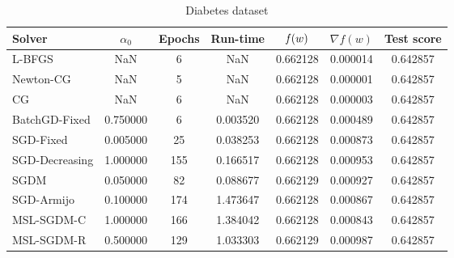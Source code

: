 \cleardoublepage
\begin{table}
\centering
\caption{Diabetes dataset}
\label{tab:diab-table}
\begin{tabular}{lS[round-precision=3]S[drop-zero-decimal]S[round-precision=4]S[round-precision=6]S[exponent-mode=scientific]S[round-precision=6]}
\toprule
Solver & {$\alpha_0$} & {Epochs} & {Run-time} & {$\operatorname*{\mathit{f}}(w)$} & {$\nabla f(w)$} & {Test score} \\
\midrule
L-BFGS & NaN & 6 & NaN & 0.662128 & 0.000014 & 0.642857 \\
Newton-CG & NaN & 5 & NaN & 0.662128 & 0.000001 & 0.642857 \\
CG & NaN & 6 & NaN & 0.662128 & 0.000003 & 0.642857 \\
BatchGD-Fixed & 0.750000 & 6 & 0.003520 & 0.662128 & 0.000489 & 0.642857 \\
SGD-Fixed & 0.005000 & 25 & 0.038253 & 0.662128 & 0.000873 & 0.642857 \\
SGD-Decreasing & 1.000000 & 155 & 0.166517 & 0.662128 & 0.000953 & 0.642857 \\
SGDM & 0.050000 & 82 & 0.088677 & 0.662129 & 0.000927 & 0.642857 \\
SGD-Armijo & 0.100000 & 174 & 1.473647 & 0.662128 & 0.000867 & 0.642857 \\
MSL-SGDM-C & 1.000000 & 166 & 1.384042 & 0.662128 & 0.000843 & 0.642857 \\
MSL-SGDM-R & 0.500000 & 129 & 1.033303 & 0.662129 & 0.000987 & 0.642857 \\
\bottomrule
\end{tabular}
\end{table}

